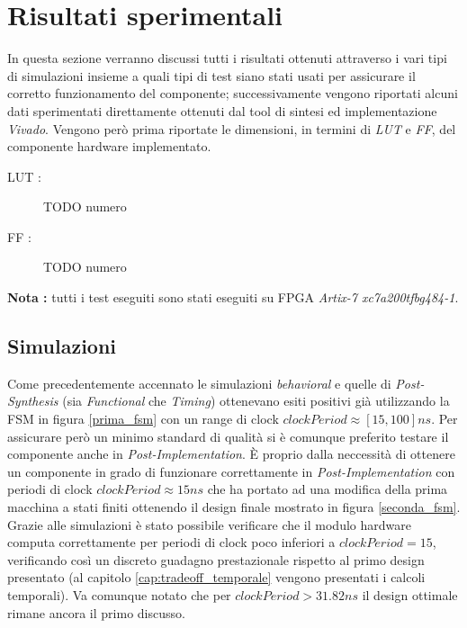 \documentclass[11pt,a4paper]{article}
\begin{document}
    \section{Risultati sperimentali}
        In questa sezione verranno discussi tutti i risultati ottenuti attraverso i vari tipi di simulazioni insieme a quali tipi di test siano stati usati per assicurare il corretto funzionamento del componente; successivamente vengono riportati alcuni dati sperimentati direttamente ottenuti dal tool di sintesi ed implementazione \textit{Vivado}.
        Vengono però prima riportate le dimensioni, in termini di \textit{LUT} e \textit{FF}, del componente hardware implementato.
        \begin{description}
            \item[LUT : ] TODO numero
            \item[FF : ] TODO numero 
        \end{description}
        \textbf{Nota :} tutti i test eseguiti sono stati eseguiti su FPGA \textit{Artix-7 xc7a200tfbg484-1}.
        \subsection{Simulazioni}
            Come precedentemente accennato le simulazioni \textit{behavioral} e quelle di \textit{Post-Synthesis} (sia \textit{Functional} che \textit{Timing}) ottenevano esiti positivi già utilizzando la FSM in figura \ref{prima_fsm} con un range di clock $clockPeriod \approx [15,100] ns$.
            Per assicurare però un minimo standard di qualità si è comunque preferito testare il componente anche in \textit{Post-Implementation}.
            È proprio dalla neccessità di ottenere un componente in grado di funzionare correttamente in  \textit{Post-Implementation} con periodi di clock $clockPeriod \approx 15 ns$ che ha portato ad una modifica della prima macchina a stati finiti ottenendo il design finale mostrato in figura \ref{seconda_fsm}.\\
            Grazie alle simulazioni è stato possibile verificare che il modulo hardware computa correttamente per periodi di clock poco inferiori a $clockPeriod = 15$, verificando così un discreto guadagno prestazionale rispetto al primo design presentato (al capitolo \ref{cap:tradeoff_temporale} vengono presentati i calcoli temporali).
            Va comunque notato che per $clockPeriod > 31.82ns$ il design ottimale rimane ancora il primo discusso.
            \newpage
\end{document}
